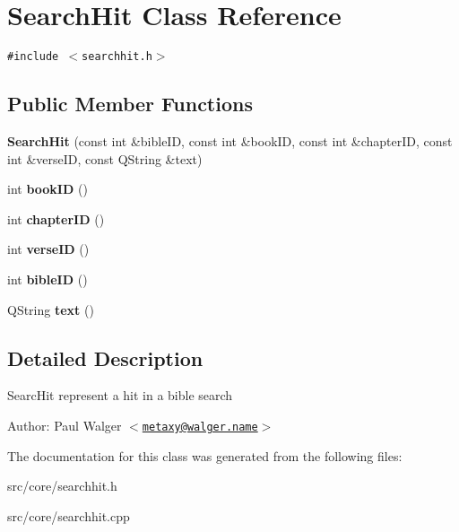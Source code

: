 \hypertarget{classSearchHit}{
\section{SearchHit Class Reference}
\label{classSearchHit}
}
{\tt \#include $<$searchhit.h$>$}

\subsection*{Public Member Functions}
\begin{CompactItemize}
\item 
\hypertarget{classSearchHit_f526354ebfb42d6091f3da55117e9958}{
\textbf{SearchHit} (const int \&bibleID, const int \&bookID, const int \&chapterID, const int \&verseID, const QString \&text)}
\label{classSearchHit_f526354ebfb42d6091f3da55117e9958}

\item 
\hypertarget{classSearchHit_9c78f4832e60f93571f15e89e30c6191}{
int \textbf{bookID} ()}
\label{classSearchHit_9c78f4832e60f93571f15e89e30c6191}

\item 
\hypertarget{classSearchHit_40a5c7eabd87ef4a0987b52da95929d3}{
int \textbf{chapterID} ()}
\label{classSearchHit_40a5c7eabd87ef4a0987b52da95929d3}

\item 
\hypertarget{classSearchHit_1dd0cd0b18ff52629b476f129cc53377}{
int \textbf{verseID} ()}
\label{classSearchHit_1dd0cd0b18ff52629b476f129cc53377}

\item 
\hypertarget{classSearchHit_af59f8e8b54164c9d369b8148bfb5e18}{
int \textbf{bibleID} ()}
\label{classSearchHit_af59f8e8b54164c9d369b8148bfb5e18}

\item 
\hypertarget{classSearchHit_e7c70f7ec454099ae9a052a4e4efa6a4}{
QString \textbf{text} ()}
\label{classSearchHit_e7c70f7ec454099ae9a052a4e4efa6a4}

\end{CompactItemize}


\subsection{Detailed Description}
SearcHit represent a hit in a bible search

\begin{Desc}
\item[Author:]Paul Walger $<$\href{mailto:metaxy@walger.name}{\tt metaxy@walger.name}$>$ \end{Desc}


The documentation for this class was generated from the following files:\begin{CompactItemize}
\item 
src/core/searchhit.h\item 
src/core/searchhit.cpp\end{CompactItemize}

